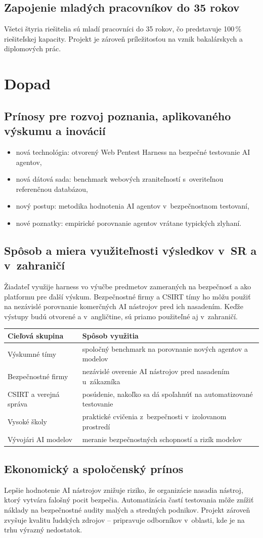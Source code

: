 \documentclass[11pt,a4paper]{article}
\newcommand{\bod}[1]{\subsection*{#1}}
\begin{document}
\bod{Zapojenie mladých pracovníkov do 35 rokov}
Všetci štyria riešitelia sú mladí pracovníci do 35 rokov, čo predstavuje 100\,\% riešiteľskej kapacity. Projekt je zároveň príležitosťou na vznik bakalárskych a diplomových prác.

\section{Dopad}

\bod{Prínosy pre rozvoj poznania, aplikovaného výskumu a inovácií}
\begin{itemize}
  \item nová technológia: otvorený Web Pentest Harness na bezpečné testovanie AI agentov,
  \item nová dátová sada: benchmark webových zraniteľností s~overiteľnou referenčnou databázou,
  \item nový postup: metodika hodnotenia AI agentov v~bezpečnostnom testovaní,
  \item nové poznatky: empirické porovnanie agentov vrátane typických zlyhaní.
\end{itemize}

\bod{Spôsob a miera využiteľnosti výsledkov v~SR a v~zahraničí}
Žiadateľ využije harness vo výučbe predmetov zameraných na bezpečnosť a ako platformu pre ďalší výskum. Bezpečnostné firmy a CSIRT tímy ho môžu použiť na nezávislé porovnanie komerčných AI nástrojov pred ich nasadením. Keďže výstupy budú otvorené a v~angličtine, sú priamo použiteľné aj v~zahraničí.

\medskip\noindent
\begin{tabularx}{\textwidth}{@{}lX@{}}
\toprule
\textbf{Cieľová skupina} & \textbf{Spôsob využitia} \\ \midrule
Výskumné tímy & spoločný benchmark na porovnanie nových agentov a modelov \\
Bezpečnostné firmy & nezávislé overenie AI nástrojov pred nasadením u~zákazníka \\
CSIRT a verejná správa & posúdenie, nakoľko sa dá spoľahnúť na automatizované testovanie \\
Vysoké školy & praktické cvičenia z~bezpečnosti v~izolovanom prostredí \\
Vývojári AI modelov & meranie bezpečnostných schopností a rizík modelov \\ \bottomrule
\end{tabularx}

\bod{Ekonomický a spoločenský prínos}
Lepšie hodnotenie AI nástrojov znižuje riziko, že organizácie nasadia nástroj, ktorý vytvára falošný pocit bezpečia. Automatizácia častí testovania môže znížiť náklady na bezpečnostné audity malých a stredných podnikov. Projekt zároveň zvyšuje kvalitu ľudských zdrojov -- pripravuje odborníkov v~oblasti, kde je na trhu výrazný nedostatok.
\end{document}
